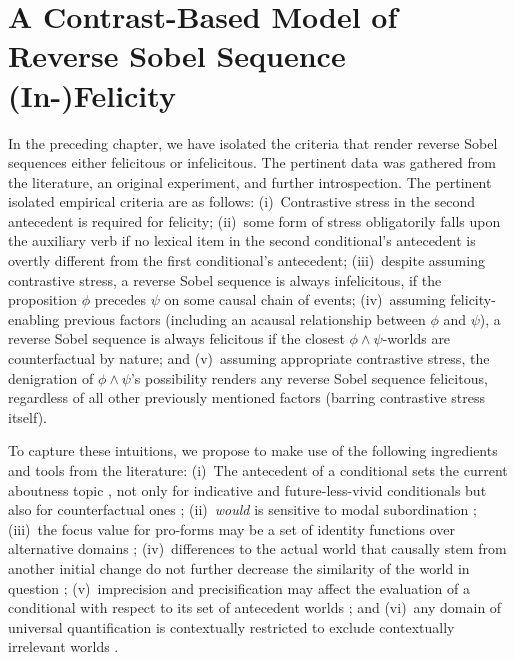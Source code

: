 \chapter{A Contrast-Based Model of Reverse Sobel Sequence (In-)Felicity}
In the preceding chapter, we have isolated the criteria that render reverse Sobel sequences either felicitous or infelicitous. The pertinent data was gathered from the literature, an original experiment, and further introspection. The pertinent isolated empirical criteria are as follows: (i)~Contrastive stress in the second antecedent is required for felicity; (ii)~some form of stress obligatorily falls upon the auxiliary verb if no lexical item in the second conditional's antecedent is overtly different from the first conditional's antecedent; (iii)~despite assuming contrastive stress, a reverse Sobel sequence is always infelicitous, if the proposition $\phi$ precedes $\psi$ on some causal chain of events; (iv)~assuming felicity-enabling previous factors (including an acausal relationship between $\phi$ and $\psi$), a reverse Sobel sequence is always felicitous if the closest $\phi\land\psi$-worlds are counterfactual by nature; and (v)~assuming appropriate contrastive stress, the denigration of $\phi\land\psi$'s possibility renders any reverse Sobel sequence felicitous, regardless of all other previously mentioned factors (barring contrastive stress itself).%

To capture these intuitions, we propose to make use of the following ingredients and tools from the literature: (i)~The antecedent of a conditional sets the current aboutness topic \parencite{Ebert2008}, not only for indicative and future-less-vivid conditionals but also for counterfactual ones \parencite[cf.][p.~139]{Ebert2008}; (ii)~\textit{would} is sensitive to modal subordination \parencite{Klecha2011,Klecha2014,Klecha2015}; (iii)~the focus value for pro-forms may be a set of identity functions over alternative domains \parencite{Jacobson2004}; (iv)~differences to the actual world that causally stem from another initial change do not further decrease the similarity of the world in question \parencite{Bennett2003,Arregui2009}; (v)~imprecision and precisification may affect the evaluation of a conditional with respect to its set of antecedent worlds \parencite{Klecha2014,Klecha2015}; and (vi)~any domain of universal quantification is contextually restricted to exclude contextually irrelevant worlds \parencites{Fintel1994}{Reimer1998}{Stanley2000}{Klecha2014}[amongst many others]{Klecha2015}.

